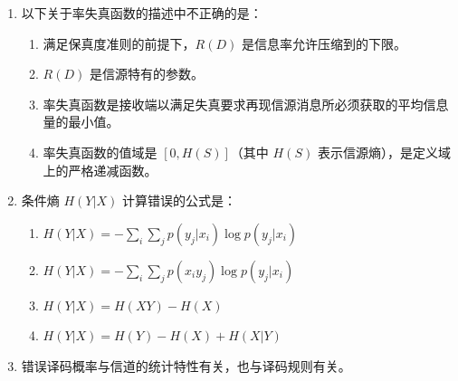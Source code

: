 \documentclass[UTF8,a4paper,12pt]{ctexart}
\newcommand{\blank}[1][3cm]{\underline{\hspace{#1}}}
\begin{document}
\begin{enumerate}[label=\arabic*., leftmargin=2em, itemsep=1.4em]
\begin{center}
\end{center}

$X,Y,Z$ 构成马尔可夫链，则
\[
I(XY;Z)\ \blank[1.2cm]\ I(Y;Z),
\]
\[
I(X;Z)\ \blank[1.2cm]\ I(Y;Z),
\]
\[
P_{Z|X}\ \blank[1.2cm]\ P_{Y|X}P_{Z|Y}.
\]

依次应是：

\begin{enumerate}[label=\Alph*. , leftmargin=2em, itemsep=0.4em]
\item 大于等于，大于，小于
\item 等于，小于等于，等于
\item 小于，等于，大于
\item 小于等于，大于，等于
\end{enumerate}


\item 以下关于率失真函数的描述中不正确的是：

\begin{enumerate}[label=\Alph*. , leftmargin=2em, itemsep=0.4em]
\item 满足保真度准则的前提下，$R(D)$ 是信息率允许压缩到的下限。
\item $R(D)$ 是信源特有的参数。
\item 率失真函数是接收端以满足失真要求再现信源消息所必须获取的平均信息量的最小值。
\item 率失真函数的值域是 $[0,H(S)]$（其中 $H(S)$ 表示信源熵），是定义域上的严格递减函数。
\end{enumerate}


\item 条件熵 $H(Y|X)$ 计算错误的公式是：

\begin{enumerate}[label=\Alph*. , leftmargin=2em, itemsep=0.4em]
\item
$H(Y|X)
=
-\sum_i\sum_j p(y_j|x_i)\log p(y_j|x_i)
$

\item
$
H(Y|X)
=
-\sum_i\sum_j p(x_i y_j)\log p(y_j|x_i)
$

\item
$
H(Y|X)=H(XY)-H(X)
$

\item
$
H(Y|X)=H(Y)-H(X)+H(X|Y)
$
\end{enumerate}


\item 错误译码概率与信道的统计特性有关，也与译码规则有关。


\end{enumerate}
\end{document}
